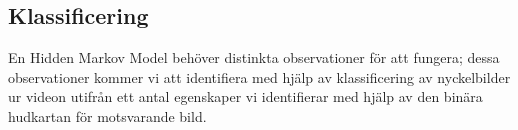 \documentclass[../rapport_MVEX01-11-05]{subfiles}
\begin{document}
\subsection{Klassificering}
En Hidden Markov Model behöver distinkta observationer för att fungera; dessa
observationer kommer vi att identifiera med hjälp av klassificering av
nyckelbilder ur videon utifrån ett antal egenskaper vi identifierar
med hjälp av den binära hudkartan för motsvarande bild.



\end{document}
